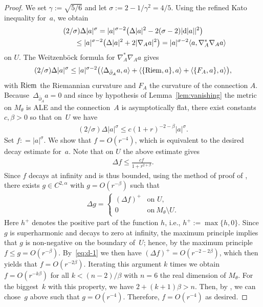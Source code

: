\documentclass[pdftex]{sigma}
\numberwithin{equation}{section}
\newcommand{\rd}{{\rm d}}
\newcommand{\delbar}{\bar \del}
\newcommand{\del}{\partial}
\begin{document}
\begin{proof}
  We set $\gamma := \sqrt{5/6}$ and let $\sigma
  :=2-1/\gamma^2=4/5$. Using the ref\/ined Kato inequality for~$a$, we
  obtain
  \begin{gather*}
    (2/\sigma) \Delta |a|^\sigma
      = |a|^{\sigma-2}\big(\Delta|a|^2-2(\sigma-2)|\rd|a||^2\big) \\
\hphantom{(2/\sigma) \Delta |a|^\sigma}{} \leq |a|^{\sigma-2}\big(\Delta|a|^2+2|\nabla_A a|^2\big)
     = |a|^{\sigma-2}\langle a,\nabla_A^*\nabla_Aa\rangle
   \end{gather*}
   on $U$. The Weitzenb\"ock formula for $\nabla_A^*\nabla_Aa$ gives
   \begin{gather*}
    (2/\sigma) \Delta |a|^\sigma
      \leq |a|^{\sigma-2}
     \big(\langle \Delta_{\delbar_A} a,a\rangle
       +\langle \{{\rm Riem},a\},a\rangle +\langle \{F_A,a\},a\rangle \big),
   \end{gather*}
   with ${\rm Riem}$ the Riemannian curvature and $F_A$ the
   curvature of the connection $A$.  Because~$\Delta_{\delbar_A} a=0$
   and since by hypothesis of Lemma~\ref{lem:vanishing} the metric on
   $M_{\theta}$ is ALE and the connection~$A$ is asymptotically f\/lat,
   there exist constants $c,\beta>0$ so that on~$U$ we have
   \begin{gather*}
     (2/\sigma) \Delta |a|^\sigma \leq c (1+r)^{-2-\beta} |a|^{\sigma}.
   \end{gather*}
   Set $f: =|a|^\sigma$.  We show that $f=O(r^{-4})$, which is
   equivalent to the desired decay estimate for~$a$.  Note that on
   $U$ the above estimate gives
   \begin{gather}\label{eq:d-1}
     \Delta f \leq \frac{cf}{1+r^{2+\beta}}.
   \end{gather}
   Since $f$ decays at inf\/inity and is thus bounded, using the method of proof of
   \cite[Theorem~8.3.6(a)]{Joyce2000}, there exists $g\in
   C^{2,\alpha}$ with $g=O(r^{-\beta})$ such that
    \begin{gather*}
     \Delta g
     =\begin{cases}
       (\Delta f)^+ & \text{on $U$}, \\
       0 & \text{on}~M_{\theta}{\setminus} U .
     \end{cases}
  \end{gather*}
  Here $h^+$ denotes the positive part of the function $h$, i.e., $h^+
  := \max \{h, 0\}$.  Since $g$ is superharmonic and decays to zero at
  inf\/inity, the maximum principle implies that $g$ is non-negative on
  the boundary of~$U$; hence, by the maximum principle $f\leq g =
  O(r^{-\beta})$.  By~\eqref{eq:d-1} we then have $(\Delta f)^{+}=
  O(r^{-2-2\beta})$, which then yields that $f=O(r^{-2\beta})$.
  Iterating this argument $k$ times we obtain $f=O(r^{-k\beta})$ for
  all $k< (n-2)/\beta$ with $n = 6$ the real dimension of $M_\theta$.
  For the biggest~$k$ with this property, we have $2+(k+1)\beta>n$.
  Then, by \cite[Theorem~8.3.6(b)]{Joyce2000}, we can chose~$g$ above
  such that $g=O(r^{-4})$.  Therefore, $f=O(r^{-4})$ as desired.
\end{proof}
\end{document}
